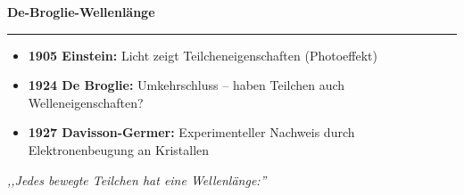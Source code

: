 \documentclass[11pt,a4paper,landscape]{article}
\begin{document}

\begin{center}
{\LARGE\bfseries De-Broglie-Wellenlänge}\\[0.3em]
\rule{0.5\textwidth}{1.5pt}
\end{center}

\vspace{0.5em}


\begin{minipage}[t]{0.48\textwidth}



\vspace{0.5em}

\begin{itemize}
    \setlength{\itemsep}{4pt}
    \item \textbf{1905 Einstein:} Licht zeigt Teilcheneigenschaften (Photoeffekt)
    \item \textbf{1924 De Broglie:} Umkehrschluss -- haben Teilchen auch Welleneigenschaften?
    \item \textbf{1927 Davisson-Germer:} Experimenteller Nachweis durch Elektronenbeugung an Kristallen
\end{itemize}

\vspace{0.8em}



\vspace{0.5em}

\textit{,,Jedes bewegte Teilchen hat eine Wellenlänge:''}


\end{minipage}
\end{document}
